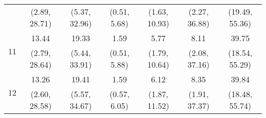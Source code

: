 \documentclass{article}
\begin{document}
\begin{table}
\begin{tabular}{ccccccc}
		 & (2.89, 28.71) & (5.37, 32.96) & (0.51, 5.68) & (1.63, 10.93) & (2.27, 36.88) & (19.49, 55.36)\\
		\multirow{2}{*}{11} & 13.44 & 19.33 & 1.59 & 5.77 & 8.11 & 39.75\\
		 & (2.79, 28.64) & (5.44, 33.91) & (0.51, 5.88) & (1.79, 10.64) & (2.08, 37.16) & (18.54, 55.29)\\
		\multirow{2}{*}{12} & 13.26 & 19.41 & 1.59 & 6.12 & 8.35 & 39.84\\
		 & (2.60, 28.58) & (5.57, 34.67) & (0.57, 6.05) & (1.87, 11.52) & (1.91, 37.37) & (18.48, 55.74)\\
	\end{tabular}
\label{tab:fevd-Model_PERR_Q_govexp-govExpQoq}
\end{table}
\end{document}
